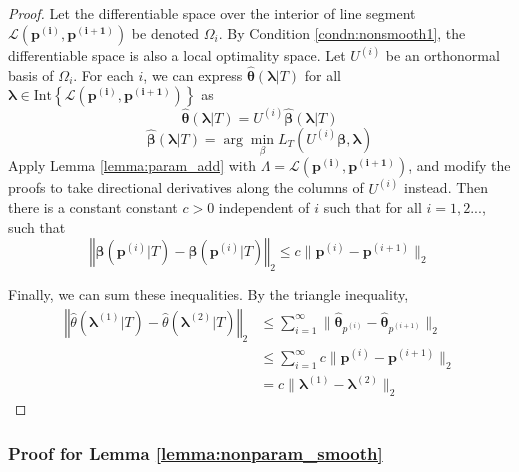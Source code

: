 \documentclass[12pt]{article}
\begin{document}
\begin{proof}
	Let the differentiable
	space over the interior of line segment $\mathcal{L}\left(\boldsymbol{p^{(i)},p^{(i+1)}}\right)$
	be denoted $\Omega_{i}$. 
	By Condition \ref{condn:nonsmooth1}, the differentiable space is also a local optimality
	space. Let $U^{(i)}$ be an orthonormal basis of $\Omega_{i}$. For
	each $i$, we can express $\hat{\boldsymbol{\theta}}(\boldsymbol{\lambda} | T)$ for
	all $\boldsymbol{\lambda}\in\mbox{Int}\left\{ \mathcal{L}\left(\boldsymbol{p^{(i)},p^{(i+1)}}\right)\right\} $
	as
	\[
	\hat{\boldsymbol{\theta}}(\boldsymbol{\lambda} | T)=U^{(i)}\hat{\boldsymbol{\beta}}(\boldsymbol{\lambda} | T)
	\]
	\[
	\hat{\boldsymbol{\beta}}(\boldsymbol{\lambda} | T)=\arg\min_{\beta}L_{T}(U^{(i)}\boldsymbol{\beta},\boldsymbol{\lambda})
	\]
	Apply Lemma \ref{lemma:param_add} with $\Lambda= \mathcal{L}\left(\boldsymbol{p^{(i)},p^{(i+1)}}\right)$, and modify the proofs to take directional derivatives
	along the columns of $U^{(i)}$ instead. Then there is a constant
	constant $c>0$ independent of $i$ such that for all $i=1,2...$,
	such that
	\[
	\left\Vert 
	\boldsymbol{\hat{\beta}}(\boldsymbol{p}^{(i)} | T)
	-\boldsymbol{\hat{\beta}}(\boldsymbol{p}^{(i)} | T)
	\right\Vert _{2}
	\le 
	c\|\boldsymbol{p}^{(i)}-\boldsymbol{p}^{(i+1)}\|_{2}
	\]
	
	
	Finally, we can sum these inequalities. By the triangle inequality,
	\begin{align*}
		\left\Vert 
		\hat{\theta}(\boldsymbol{\lambda}^{(1)} |T)
		- \hat{\theta}(\boldsymbol{\lambda}^{(2)} |T)
		\right\Vert _{2} 
		& \le \sum_{i=1}^{\infty}\|\boldsymbol{\hat{\theta}}_{p^{(i)}}-\boldsymbol{\hat{\theta}}_{p^{(i+1)}}\|_{2}\\
		& \le \sum_{i=1}^{\infty}
		c\|\boldsymbol{p}^{(i)}-\boldsymbol{p}^{(i+1)}\|_{2}\\
		& = c\|\boldsymbol{\lambda}^{(1)}-\boldsymbol{\lambda}^{(2)}\|_{2}
	\end{align*}
\end{proof}

\subsubsection{Proof for Lemma \ref{lemma:nonparam_smooth}}
\end{document}
